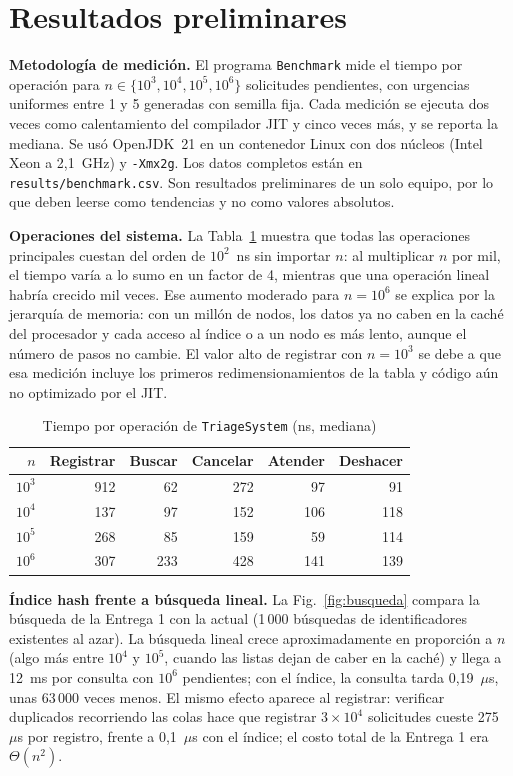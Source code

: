 \section{Resultados preliminares}
\label{sec:resultados}

\textbf{Metodología de medición.} El programa \texttt{Benchmark} mide el
tiempo por operación para $n \in \{10^3, 10^4, 10^5, 10^6\}$ solicitudes
pendientes, con urgencias uniformes entre 1 y 5 generadas con semilla fija.
Cada medición se ejecuta dos veces como calentamiento del compilador JIT y
cinco veces más, y se reporta la mediana. Se usó OpenJDK~21 en un
contenedor Linux con dos núcleos (Intel Xeon a 2{,}1~GHz) y \texttt{-Xmx2g}.
Los datos completos están en \texttt{results/benchmark.csv}. Son
resultados preliminares de un solo equipo, por lo que deben leerse como
tendencias y no como valores absolutos.

\textbf{Operaciones del sistema.} La Tabla~\ref{tab:sistema} muestra que
todas las operaciones principales cuestan del orden de $10^2$~ns sin
importar $n$: al multiplicar $n$ por mil, el tiempo varía a lo sumo en un
factor de 4, mientras que una operación lineal habría crecido mil veces.
Ese aumento moderado para $n=10^6$ se explica por la jerarquía de memoria:
con un millón de nodos, los datos ya no caben en la caché del procesador y
cada acceso al índice o a un nodo es más lento, aunque el número de pasos
no cambie. El valor alto de registrar con $n=10^3$ se debe a que esa
medición incluye los primeros redimensionamientos de la tabla y código aún
no optimizado por el JIT.

\begin{table}[t]
  \caption{Tiempo por operación de \texttt{TriageSystem} (ns, mediana)}
  \label{tab:sistema}
  \centering
  \footnotesize
  \begin{tabular}{rrrrrr}
    \toprule
    $n$ & Registrar & Buscar & Cancelar & Atender & Deshacer \\
    \midrule
    $10^3$ & 912 & 62 & 272 & 97 & 91 \\
    $10^4$ & 137 & 97 & 152 & 106 & 118 \\
    $10^5$ & 268 & 85 & 159 & 59 & 114 \\
    $10^6$ & 307 & 233 & 428 & 141 & 139 \\
    \bottomrule
  \end{tabular}
\end{table}

\textbf{Índice hash frente a búsqueda lineal.} La
Fig.~\ref{fig:busqueda} compara la búsqueda de la Entrega 1 con la actual
(1\,000 búsquedas de identificadores existentes al azar). La búsqueda lineal
crece aproximadamente en proporción a $n$ (algo más entre $10^4$ y $10^5$,
cuando las listas dejan de caber en la caché) y llega a 12~ms por consulta con $10^6$
pendientes; con el índice, la consulta tarda 0{,}19~$\mu$s, unas 63\,000
veces menos. El mismo efecto aparece al registrar: verificar duplicados
recorriendo las colas hace que registrar $3\times10^4$ solicitudes cueste
275~$\mu$s por registro, frente a 0{,}1~$\mu$s con el índice; el costo total
de la Entrega 1 era $\Theta(n^2)$.

